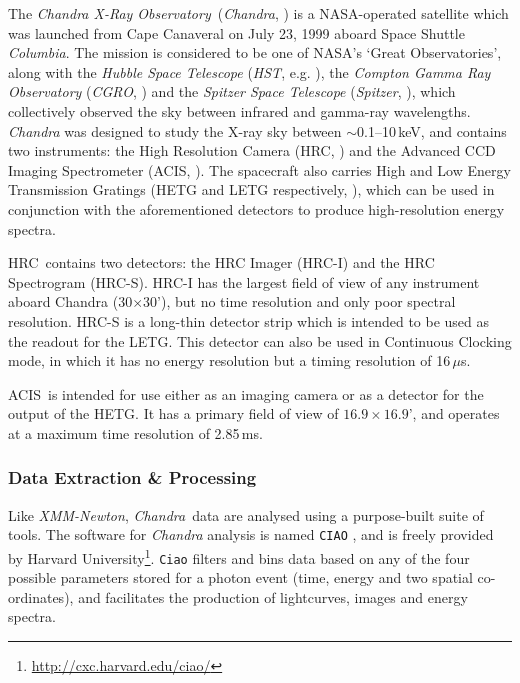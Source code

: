 \par The \textit{Chandra X-Ray Observatory}\indexchandra\ (\textit{Chandra}, \citealp{Weisskopf_Chandra}) is a NASA-operated satellite which was launched from Cape Canaveral on July 23, 1999 aboard Space Shuttle \textit{Columbia}.  The mission is considered to be one of NASA's `Great Observatories', along with the \textit{Hubble Space Telescope} (\textit{HST}, e.g. \citealp{Holtzman_Hubble}), the \textit{Compton Gamma Ray Observatory} (\textit{CGRO}, \citealp{Gehrels_CGRO}) and the \textit{Spitzer Space Telescope} (\textit{Spitzer}, \citealp{Fanson_Spitzer}), which collectively observed the sky between infrared and gamma-ray wavelengths.  \textit{Chandra} was designed to study the X-ray sky between $\sim$0.1--10\,keV, and contains two instruments: the High Resolution Camera (HRC\indexhrc, \citealp{Kenter_HRCI}) and the Advanced CCD Imaging Spectrometer (ACIS\indexacis, \citealp{Nousek_ACIS}).  The spacecraft also carries High and Low Energy Transmission Gratings (HETG and LETG respectively, \citealp{Markert_HETG,Brinkman_LETG}), which can be used in conjunction with the aforementioned detectors to produce high-resolution energy spectra.
\par HRC\indexhrc\ contains two detectors: the HRC Imager (HRC-I) and the HRC Spectrogram (HRC-S).  HRC-I has the largest field of view of any instrument aboard Chandra (30$\times$30'), but no time resolution and only poor spectral resolution.  HRC-S is a long-thin detector strip which is intended to be used as the readout for the LETG.  This detector can also be used in Continuous Clocking mode, in which it has no energy resolution but a timing resolution of 16\,$\mu$s.
\par ACIS\indexacis\ is intended for use either as an imaging camera or as a detector for the output of the HETG.  It has a primary field of view of $16.9\times16.9$', and operates at a maximum time resolution of 2.85\,ms.

\subsubsection{Data Extraction \& Processing}
\par Like \textit{XMM-Newton}, \textit{Chandra}\indexchandra\ data are analysed using a purpose-built suite of tools.  The software for \textit{Chandra} analysis is named \texttt{CIAO} \citep{Fruscione_Ciao}, and is freely provided by Harvard University\footnote{\url{http://cxc.harvard.edu/ciao/}}.  \texttt{Ciao} filters and bins data based on any of the four possible parameters stored for a photon event (time, energy and two spatial co-ordinates), and facilitates the production of lightcurves, images and energy spectra.

